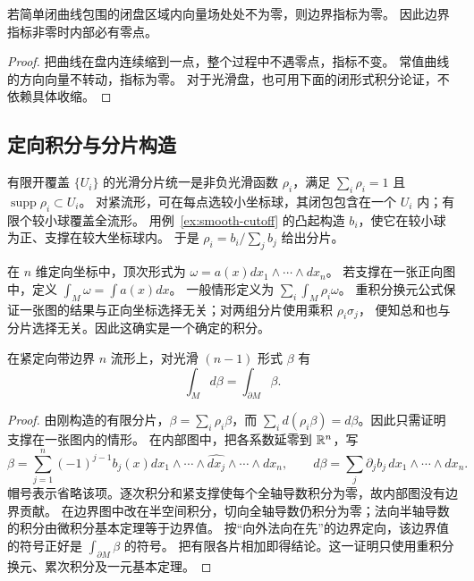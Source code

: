 \begin{theorem}[边界指标与零点]
若简单闭曲线包围的闭盘区域内向量场处处不为零，则边界指标为零。
因此边界指标非零时内部必有零点。
\end{theorem}
\begin{proof}
把曲线在盘内连续缩到一点，整个过程中不遇零点，指标不变。
常值曲线的方向向量不转动，指标为零。
对于光滑盘，也可用下面的闭形式积分论证，不依赖具体收缩。
\end{proof}

\subsection*{定向积分与分片构造}
\begin{definition}[从属分片与形式的积分]\label{def:partition-integration}
有限开覆盖 $\{U_i\}$ 的光滑分片统一是非负光滑函数 $\rho_i$，满足
$\sum_i\rho_i=1$ 且 $\operatorname{supp}\rho_i\subset U_i$。
对紧流形，可在每点选较小坐标球，其闭包包含在一个 $U_i$ 内；有限个较小球覆盖全流形。
用例~\ref{ex:smooth-cutoff} 的凸起构造 $b_i$，使它在较小球为正、支撑在较大坐标球内。
于是 $\rho_i=b_i/\sum_jb_j$ 给出分片。
\end{definition}
在 $n$ 维定向坐标中，顶次形式为 $\omega=a(x)dx_1\wedge\cdots\wedge dx_n$。
若支撑在一张正向图中，定义 $\displaystyle\int_M\omega=\displaystyle\int a(x)dx$。
一般情形定义为 $\sum_i\displaystyle\int_M\rho_i\omega$。
重积分换元公式保证一张图的结果与正向坐标选择无关；对两组分片使用乘积 $\rho_i\sigma_j$，
便知总和也与分片选择无关。因此这确实是一个确定的积分。
\begin{proposition}[Stokes 公式]\label{prop:forms-stokes-calculus}
在紧定向带边界 $n$ 流形上，对光滑 $(n-1)$ 形式 $\beta$ 有
\[
 \int_M d\beta=\int_{\partial M}\beta.
\]
\end{proposition}
\begin{proof}
由刚构造的有限分片，$\beta=\sum_i\rho_i\beta$，而
$\sum_i d(\rho_i\beta)=d\beta$。因此只需证明支撑在一张图内的情形。
在内部图中，把各系数延零到 $\mathbb{R}^n$，写
\[
 \beta=\sum_{j=1}^n(-1)^{j-1}b_j(x)
 dx_1\wedge\cdots\wedge\widehat{dx_j}\wedge\cdots\wedge dx_n,
 \qquad d\beta=\sum_j\partial_jb_j\,dx_1\wedge\cdots\wedge dx_n.
\]
帽号表示省略该项。逐次积分和紧支撑使每个全轴导数积分为零，故内部图没有边界贡献。
在边界图中改在半空间积分，切向全轴导数仍积分为零；法向半轴导数的积分由微积分基本定理等于边界值。
按“向外法向在先”的边界定向，该边界值的符号正好是 $\displaystyle\int_{\partial M}\beta$ 的符号。
把有限各片相加即得结论。这一证明只使用重积分换元、累次积分及一元基本定理。
\end{proof}



